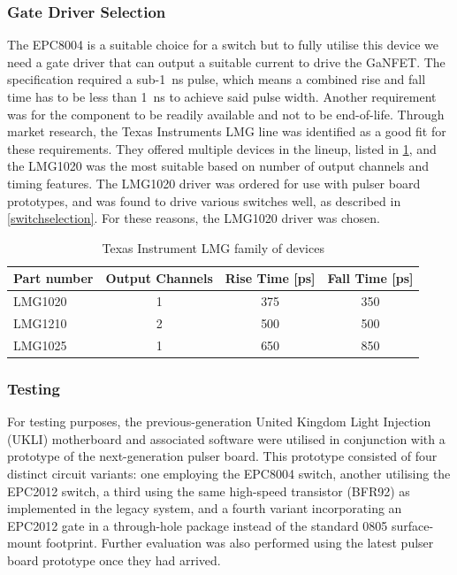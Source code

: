 \documentclass[a4paper,11pt]{article}
\begin{document}
\subsubsection{Gate Driver Selection}

The EPC8004 is a suitable choice for a switch but to fully utilise this device we need a gate driver that can output a suitable current to drive the GaNFET. The specification required a sub-1~ns pulse, which means a combined rise and fall time has to be less than 1~ns to achieve said pulse width. Another requirement was for the component to be readily available and not to be end-of-life.
Through market research, the Texas Instruments LMG line was identified as a good fit for these requirements. They offered multiple devices in the lineup, listed in \cref{tab:LMGFamily}, and the LMG1020 was the most suitable based on number of output channels and timing features. The LMG1020 driver was ordered for use with pulser board prototypes, and was found to drive various switches well, as described in \cref{switchselection}. For these reasons, the LMG1020 driver was chosen.

\begin{table}[h]
  \centering
  \caption{Texas Instrument LMG family of devices}
  \label{tab:LMGFamily}
  \begin{tabular}{l | c | c | c}
    \toprule
    Part number & Output Channels & Rise Time [ps] & Fall Time [ps] \\
    \midrule
    LMG1020    & 1      & 375 & 350     \\
    LMG1210    & 2      & 500 & 500    \\
    LMG1025   & 1      & 650 & 850     \\
    \bottomrule
  \end{tabular}
\end{table}



\subsubsection{Testing}\label{sec:LEDtesting}

For testing purposes, the previous-generation United Kingdom Light Injection (UKLI) motherboard and associated software were utilised in conjunction with a prototype of the next-generation pulser board. This prototype consisted of four distinct circuit variants: one employing the EPC8004 switch, another utilising the EPC2012 switch, a third using the same high-speed transistor (BFR92) as implemented in the legacy system, and a fourth variant incorporating an EPC2012 gate in a through-hole package instead of the standard 0805 surface-mount footprint. Further evaluation was also performed using the latest pulser board prototype once they had arrived.
\end{document}
